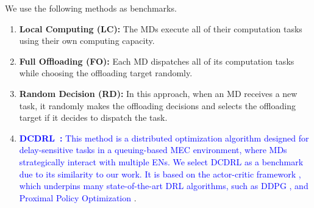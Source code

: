 \documentclass[10pt, journal,letterpaper]{IEEEtran}
\begin{document}
We use the following methods as benchmarks.
\begin{enumerate}

\item \textbf{Local Computing (LC):} The MDs execute all of their computation tasks using their own computing capacity.

\item \textbf{Full Offloading (FO):} Each MD dispatches all of its computation tasks while choosing the offloading target randomly. %

\item \textbf{Random Decision (RD):} In this approach, when an MD receives a new task, it randomly makes the offloading decisions and selects the offloading target if it decides to dispatch the task. %


\item \textcolor{blue}{\textbf{DCDRL~\cite{qiu2020distributed}:} This method is a distributed optimization algorithm designed for delay-sensitive tasks in a queuing-based MEC environment, where MDs strategically interact with multiple ENs. We select DCDRL as a benchmark due to its similarity to our work. It is based on the actor-critic framework \cite{konda1999actor}, which underpins many state-of-the-art DRL algorithms, such as DDPG \cite{lillicrap2015continuous}, and Proximal Policy Optimization \cite{schulman2017proximal}}.



	

\end{enumerate}



\end{document}
